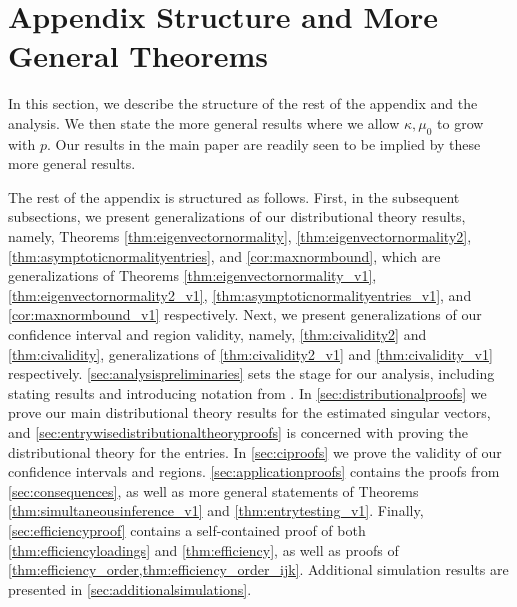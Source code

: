\documentclass[10pt]{article}
\newcommand{\0}{{\mathbf{0}}}
\newcommand{\1}{{\mathbf{1}}}
\renewcommand{\citet}{\cite}
\begin{document}






\appendix

\section{Appendix Structure and More General Theorems}
\label{sec:generaltheorems}

In this section, we  describe the structure of the rest of the appendix and the analysis.   We then state the more general results where we allow $\kappa, \mu_0$ to grow with $p$.  Our results in the main paper are readily seen to be implied by these more general results.  

The rest of the appendix is structured as follows.  First, in the subsequent subsections, we present generalizations of our distributional theory results, namely, Theorems \ref{thm:eigenvectornormality}, \ref{thm:eigenvectornormality2}, \ref{thm:asymptoticnormalityentries}, and \cref{cor:maxnormbound}, which are generalizations of Theorems  \ref{thm:eigenvectornormality_v1}, \ref{thm:eigenvectornormality2_v1}, \ref{thm:asymptoticnormalityentries_v1}, and \ref{cor:maxnormbound_v1} respectively.  Next, we present generalizations of our confidence interval and region validity, namely,  \cref{thm:civalidity2} and \cref{thm:civalidity}, generalizations of \cref{thm:civalidity2_v1} and \cref{thm:civalidity_v1} respectively. \cref{sec:analysispreliminaries} sets the stage for our analysis, including stating results and introducing notation from  \citet{agterberg_estimating_2022}.  In \cref{sec:distributionalproofs} we prove our main distributional theory results for the estimated singular vectors, and \cref{sec:entrywisedistributionaltheoryproofs} is concerned with proving the distributional theory for the entries.  In \cref{sec:ciproofs} we prove the validity of our confidence intervals and regions.  \cref{sec:applicationproofs} contains the proofs from \cref{sec:consequences}, as well as more general statements of Theorems \ref{thm:simultaneousinference_v1} and \cref{thm:entrytesting_v1}.  Finally, \cref{sec:efficiencyproof} contains a self-contained proof of both \cref{thm:efficiencyloadings} and \cref{thm:efficiency}, as well as proofs of \cref{thm:efficiency_order,thm:efficiency_order_ijk}.  Additional simulation results are presented in \cref{sec:additionalsimulations}.
\end{document}
